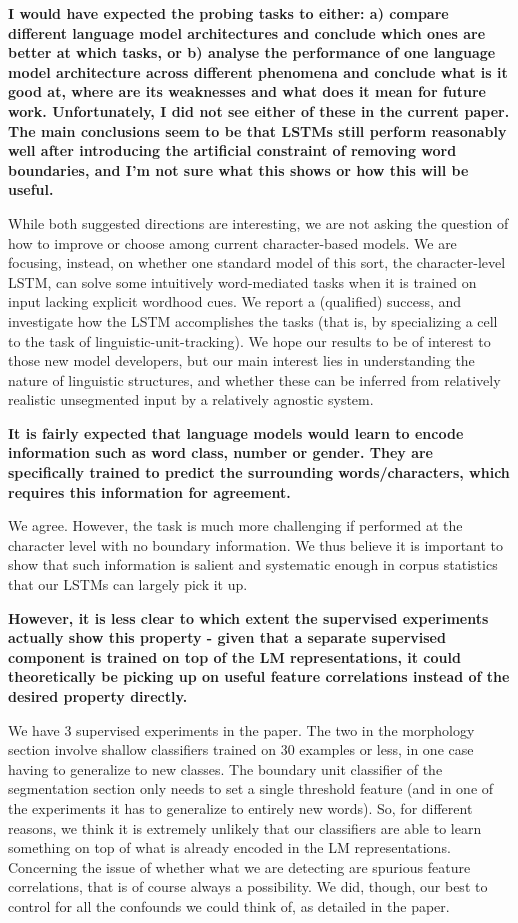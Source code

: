 \documentclass{article}[11pt,a4paper,oneside]
\begin{document}
\textbf{
I would have expected the probing tasks to either:
a) compare different language model architectures and conclude which ones
are better at which tasks, or
b) analyse the performance of one language model architecture across
different phenomena and conclude what is it good at, where are its
weaknesses and what does it mean for future work.
Unfortunately, I did not see either of these in the current paper. The main
conclusions seem to be that LSTMs still perform reasonably well after
introducing the artificial constraint of removing word boundaries, and I'm
not sure what this shows or how this will be useful.}

While both suggested directions are interesting, we are not asking the question of how to improve or choose among current character-based models. We are focusing, instead, on whether one standard model of this sort, the character-level LSTM, can solve some intuitively word-mediated tasks when it is trained on input lacking explicit wordhood cues. We report a (qualified) success, and investigate how the LSTM accomplishes the tasks (that is, by specializing a cell to the task of linguistic-unit-tracking). We hope our results to be of interest to those new model developers, but our main interest lies in understanding the nature of linguistic structures, and whether these can be inferred from relatively realistic unsegmented input by a relatively agnostic system.\newline

\textbf{
It is fairly expected that language models would learn to encode information
such as word class, number or gender. They are specifically trained to
predict the surrounding words/characters, which requires this information
for agreement.}

We agree. However, the task is much more challenging if performed at the character level with no boundary information. We thus believe it is important to show that such information is salient and systematic enough in corpus statistics that our LSTMs can largely pick it up.\newline

\textbf{
However, it is less clear to which extent the supervised
experiments actually show this property - given that a separate supervised
component is trained on top of the LM representations, it could
theoretically be picking up on useful feature correlations instead of the
desired property directly.}

We have 3 supervised experiments in the paper. The two in the morphology section involve shallow classifiers trained on 30 examples or less, in one case having to generalize to new classes. The boundary unit classifier of the segmentation section only needs to set a single threshold feature (and in one of the experiments it has to generalize to entirely new words). So, for different reasons, we think it is extremely unlikely that our classifiers are able to learn something on top of what is already encoded in the LM representations. Concerning the issue of whether what we are detecting are spurious feature correlations, that is of course always a possibility. We did, though, our best to control for all the confounds we could think of, as detailed in the paper.\newline
\end{document}
